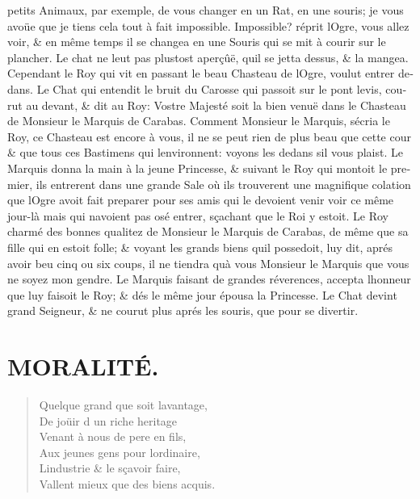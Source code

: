 \documentclass[14pt,a4paper]{memoir}
\newcommand{\notesection}[1]{%
  \addtonotes{\protect\par\protect\vspace{2ex}\protect\noindent\textbf{#1}\protect\par\protect\vspace{1ex}}%
}
\begin{document}
{{\begin{otherlanguage}{french}
petits Animaux, par exemple, de vous changer en un Rat, en une souris;
je vous avoüe que je tiens cela tout à fait impossible. Impossible?
réprit l\textquotesingle Ogre, vous allez voir, \& en même temps il se
changea en une Souris qui se mit à courir sur le plancher. Le chat ne
l\textquotesingle eut pas plustost aperçûë, qu\textquotesingle il se
jetta dessus, \& la mangea. Cependant le Roy qui vit en passant le beau
Chasteau de l\textquotesingle Ogre, voulut entrer dedans. Le Chat qui
entendit le bruit du Carosse qui passoit sur le pont levis, courut au
devant, \& dit au Roy: Vostre Majesté soit la bien venuë dans le
Chasteau de Monsieur le Marquis de Carabas. Comment Monsieur le Marquis,
s\textquotesingle écria le Roy, ce Chasteau est encore à vous, il ne se
peut rien de plus beau que cette cour \& que tous ces Bastimens qui
l\textquotesingle environnent: voyons les dedans s\textquotesingle il
vous plaist. Le Marquis donna la main à la jeune Princesse, \& suivant
le Roy qui montoit le premier, ils entrerent dans une grande Sale où ils
trouverent une magnifique colation que l\textquotesingle Ogre avoit fait
preparer pour ses amis qui le devoient venir voir ce même jour-là mais
qui n\textquotesingle avoient pas osé entrer, sçachant que le Roi y
estoit. Le Roy charmé des bonnes qualitez de Monsieur le Marquis de
Carabas, de même que sa fille qui en estoit folle; \& voyant les grands
biens qu\textquotesingle il possedoit, luy dit, aprés avoir beu cinq ou
six coups, il ne tiendra qu\textquotesingle à vous Monsieur le Marquis
que vous ne soyez mon gendre. Le Marquis faisant de grandes réverences,
accepta l\textquotesingle honneur que luy faisoit le Roy; \& dés le même
jour épousa la Princesse. Le Chat devint grand Seigneur, \& ne courut
plus aprés les souris, que pour se divertir. \\

\section{MORALITÉ.}
\notesection{MORALITÉ.}
\begin{verse}
  \small
Quelque grand que soit l\textquotesingle avantage, \\
De joüir d un riche heritage \\
Venant à nous de pere en fils, \\
Aux jeunes gens pour l\textquotesingle ordinaire, \\
L\textquotesingle industrie \& le sçavoir faire, \\
Vallent mieux que des biens acquis.


\end{verse}
\end{otherlanguage}}}
\end{document}

